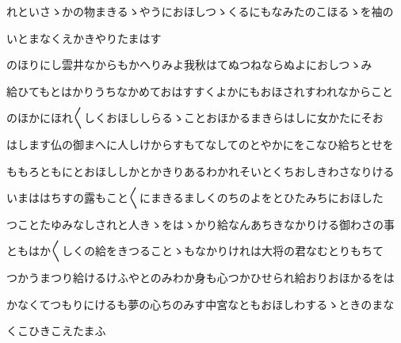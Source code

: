 \documentclass[a4paper,11pt,landscape]{ltjtarticle}
\begin{document}
れといさゝかの物まきるゝやうにおほしつゝくるにもなみたのこほるゝを袖の
\par\medskip
いとまなくえかきやりたまはす
\par\medskip
のほりにし雲井なからもかへりみよ我秋はてぬつねならぬよにおしつゝみ
\par\medskip
給ひてもとはかりうちなかめておはすすくよかにもおほされすわれなからこと
\par\medskip
のほかにほれ〱しくおほししらるゝことおほかるまきらはしに女かたにそお
\par\medskip
はします仏の御まへに人しけからすもてなしてのとやかにをこなひ給ちとせを
\par\medskip
ももろともにとおほししかとかきりあるわかれそいとくちおしきわさなりける
\par\medskip
いまははちすの露もこと〱にまきるましくのちのよをとひたみちにおほした
\par\medskip
つことたゆみなしされと人きゝをはゝかり給なんあちきなかりける御わさの事
\par\medskip
ともはか〱しくの給をきつることゝもなかりけれは大将の君なむとりもちて
\par\medskip
つかうまつり給けるけふやとのみわか身も心つかひせられ給おりおほかるをは
\par\medskip
かなくてつもりにけるも夢の心ちのみす中宮なともおほしわするゝときのまな
\par\medskip
くこひきこえたまふ
\par\medskip
\end{document}
